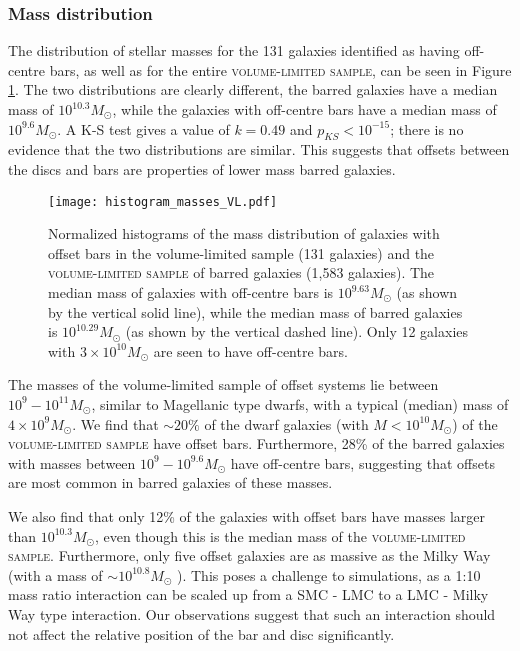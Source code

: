 \documentclass[a4paper,fleqn,usenatbib,useAMS]{mnras}
\begin{document}
\subsubsection{Mass distribution}

The distribution of stellar masses \citep[drawn from average values in the MPA-JHU catalogue;][]{Kauffmann2003a} for the 131 galaxies identified as having off-centre bars, as well as for the entire \textsc{volume-limited sample}, can be seen in Figure \ref{mass}. The two distributions are clearly different, the barred galaxies have a median mass of $10^{10.3} M_{\odot}$, while the galaxies with off-centre bars have a median mass of $10^{9.6} M_{\odot}$. A K-S test gives a value of $k=0.49$ and $p_{KS}<10^{-15}$; there is no evidence that the two distributions are similar. This suggests that offsets between the discs and bars are properties of lower mass barred galaxies. 

\begin{figure}
 \texttt{[image: histogram\_masses\_VL.pdf]}
 \caption{Normalized histograms of the mass distribution of galaxies with offset bars in the volume-limited sample (131 galaxies) and the \textsc{volume-limited sample} of barred galaxies (1,583 galaxies). The median mass of galaxies with off-centre bars is $10^{9.63} M_{\odot}$ (as shown by the vertical solid line), while the median mass of barred galaxies is $10^{10.29} M_{\odot}$ (as shown by the vertical dashed line). Only 12 galaxies with $3 \times10^{10} M_{\odot}$ are seen to have off-centre bars.}
 \label{mass}
\end{figure}

The masses of the volume-limited sample of offset systems lie between $10^{9}-10^{11} M_{\odot}$, similar to Magellanic type dwarfs, with a typical (median) mass of $4 \times 10^{9} M_{\odot}$. We find that $\sim$$20\%$ of the dwarf galaxies (with $M<10^{10} M_{\odot}$) of the \textsc{volume-limited sample} have offset bars. Furthermore, 28\% of the barred galaxies with masses between $10^{9}-10^{9.6} M_{\odot}$ have off-centre bars, suggesting that offsets are most common in barred galaxies of these masses.

We also find that only 12\% of the galaxies with offset bars have masses larger than $10^{10.3} M_{\odot}$, even though this is the median mass of the \textsc{volume-limited sample}. Furthermore, only five offset galaxies are as massive as the Milky Way (with a mass of $\sim$$10^{10.8} M_{\odot}$ \citet{Licquia2015}). This poses a challenge to simulations, as a 1:10 mass ratio interaction can be scaled up from a SMC - LMC to a LMC - Milky Way type interaction. Our observations suggest that such an interaction should not affect the relative position of the bar and disc significantly. 
\end{document}

